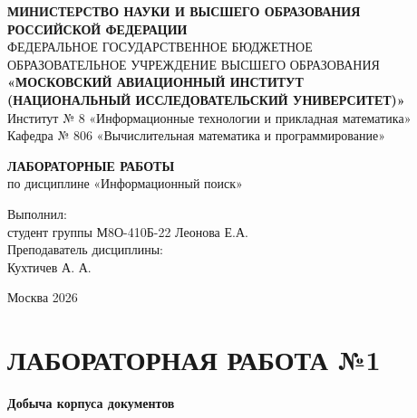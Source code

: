 \documentclass[a4paper, 12pt]{article}
\begin{document}
\begin{titlepage}
    \begin{center}
        \textbf{МИНИСТЕРСТВО НАУКИ И ВЫСШЕГО ОБРАЗОВАНИЯ\\ РОССИЙСКОЙ ФЕДЕРАЦИИ}\\[0.5cm]
        ФЕДЕРАЛЬНОЕ ГОСУДАРСТВЕННОЕ БЮДЖЕТНОЕ\\
        ОБРАЗОВАТЕЛЬНОЕ УЧРЕЖДЕНИЕ ВЫСШЕГО ОБРАЗОВАНИЯ\\[0.5cm]
        \textbf{«МОСКОВСКИЙ АВИАЦИОННЫЙ ИНСТИТУТ\\
        (НАЦИОНАЛЬНЫЙ ИССЛЕДОВАТЕЛЬСКИЙ УНИВЕРСИТЕТ)»}\\[0.5cm]
        Институт № 8 «Информационные технологии и прикладная математика»\\[0.2cm]
        Кафедра № 806 «Вычислительная математика и программирование»
        
        \vspace{5cm}
        
        \textbf{\Large ЛАБОРАТОРНЫЕ РАБОТЫ}\\
        по дисциплине «Информационный поиск»
    \end{center}
    
    \vspace{4cm}
    
    \begin{flushright}
        Выполнил:\\
        студент группы М8О-410Б-22 Леонова Е.А.\\[0.5cm]
        Преподаватель дисциплины:\\
        Кухтичев А. А.
    \end{flushright}
    
    \vfill
    
    \begin{center}
        Москва 2026
    \end{center}
\end{titlepage}

\newpage

\section*{ЛАБОРАТОРНАЯ РАБОТА №1}
\textbf{Добыча корпуса документов}
\end{document}
